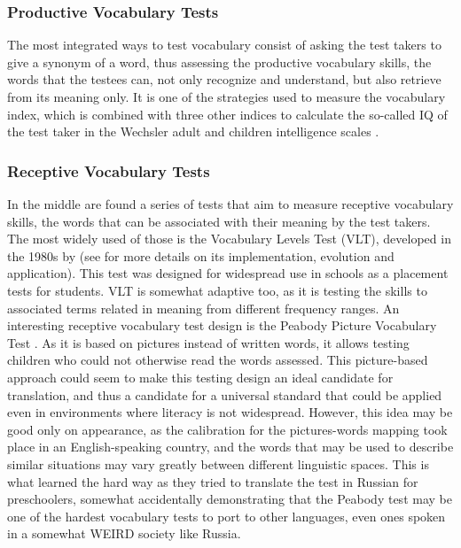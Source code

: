         \subsubsection{Productive Vocabulary Tests}
The most integrated ways to test vocabulary consist of asking the test takers to give a synonym of a word, thus assessing the productive vocabulary skills, the words that the testees can, not only recognize and understand, but also retrieve from its meaning only. It is one of the strategies used to measure the vocabulary index, which is combined with three other indices to calculate the so-called IQ of the test taker in the Wechsler adult and children intelligence scales \parencite{wechsler_wechsler_nodate}.

        \subsubsection{Receptive Vocabulary Tests}
In the middle are found a series of tests that aim to measure receptive vocabulary skills, the words that can be associated with their meaning by the test takers. The most widely used of those is the Vocabulary Levels Test (VLT), developed in the 1980s by \textcite{nation_teaching_1990} (see \cite{kremmel_vocabulary_2017} for more details on its implementation, evolution and application). This test was designed for widespread use in schools as a placement tests for students. VLT is somewhat adaptive too, as it is testing the skills to associated terms related in meaning from different frequency ranges. An interesting receptive vocabulary test design is the Peabody Picture Vocabulary Test \parencite{dunn_ppvt-4_nodate}. As it is based on pictures instead of written words, it allows testing children who could not otherwise read the words assessed. This picture-based approach could seem to make this testing design an ideal candidate for translation, and thus a candidate for a universal standard that could be applied even in environments where literacy is not widespread. However, this idea may be good only on appearance, as the calibration for the pictures-words mapping took place in an English-speaking country, and the words that may be used to describe similar situations may vary greatly between different linguistic spaces. This is what \textcite{kartushina_use_2022} learned the hard way as they tried to translate the test in Russian for preschoolers, somewhat accidentally demonstrating that the Peabody test may be one of the hardest vocabulary tests to port to other languages, even ones spoken in a somewhat WEIRD society like Russia.

